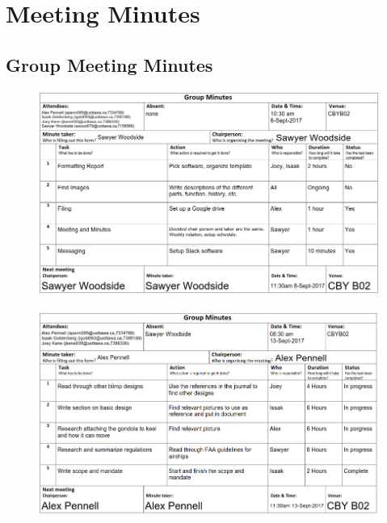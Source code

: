 \documentclass[../main.tex]{subfiles}
\begin{document}
	\chapter{Meeting Minutes}
	\section{Group Meeting Minutes}

		\begin{figure}[H]
			\centering
			\includegraphics[height=0.7\textwidth]{img/minutes/2017-09-06.PNG}
		\end{figure}
		\begin{figure}[H]
			\centering
			\includegraphics[height=0.8\textheight]{img/minutes/2017-09-13.PNG}
		\end{figure}
\end{document}
